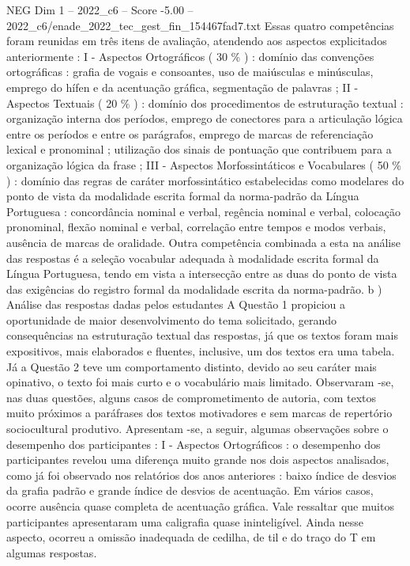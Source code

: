 \begin{textsample}{NEG Dim 1 – 2022\_c6 – Score -5.00 – 2022\_c6/enade\_2022\_tec\_gest\_fin\_154467fad7.txt}
Essas quatro competências foram reunidas em três itens de avaliação, atendendo aos aspectos explicitados anteriormente : I - Aspectos Ortográficos ( 30 \% ) : domínio das convenções ortográficas : grafia de vogais e consoantes, uso de maiúsculas e minúsculas, emprego do hífen e da acentuação gráfica, segmentação de palavras ; II - Aspectos Textuais ( 20 \% ) : domínio dos procedimentos de estruturação textual : organização interna dos períodos, emprego de conectores para a articulação lógica entre os períodos e entre os parágrafos, emprego de marcas de referenciação lexical e pronominal ; utilização dos sinais de pontuação que contribuem para a organização lógica da frase ; III - Aspectos Morfossintáticos e Vocabulares ( 50 \% ) : domínio das regras de caráter morfossintático estabelecidas como modelares do ponto de vista da modalidade escrita formal da norma-padrão da Língua Portuguesa : concordância nominal e verbal, regência nominal e verbal, colocação pronominal, flexão nominal e verbal, correlação entre tempos e modos verbais, ausência de marcas de oralidade.
Outra competência combinada a esta na análise das respostas é a seleção vocabular adequada à modalidade escrita formal da Língua Portuguesa, tendo em vista a intersecção entre as duas do ponto de vista das exigências do registro formal da modalidade escrita da norma-padrão. b ) Análise das respostas dadas pelos estudantes A Questão 1 propiciou a oportunidade de maior desenvolvimento do tema solicitado, gerando consequências na estruturação textual das respostas, já que os textos foram mais expositivos, mais elaborados e fluentes, inclusive, um dos textos era uma tabela.
Já a Questão 2 teve um comportamento distinto, devido ao seu caráter mais opinativo, o texto foi mais curto e o vocabulário mais limitado.
Observaram -se, nas duas questões, alguns casos de comprometimento de autoria, com textos muito próximos a paráfrases dos textos motivadores e sem marcas de repertório sociocultural produtivo.
Apresentam -se, a seguir, algumas observações sobre o desempenho dos participantes : I - Aspectos Ortográficos : o desempenho dos participantes revelou uma diferença muito grande nos dois aspectos analisados, como já foi observado nos relatórios dos anos anteriores : baixo índice de desvios da grafia padrão e grande índice de desvios de acentuação.
Em vários casos, ocorre ausência quase completa de acentuação gráfica.
Vale ressaltar que muitos participantes apresentaram uma caligrafia quase ininteligível.
Ainda nesse aspecto, ocorreu a omissão inadequada de cedilha, de til e do traço do T em algumas respostas.

\end{textsample}
